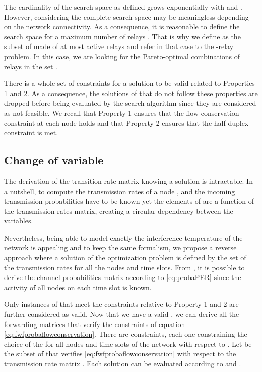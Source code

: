 \documentclass[a4paper]{article}
\begin{document}
The cardinality of the search space  as defined grows exponentially with  and . However, considering the complete search space may be meaningless depending on the network connectivity.  
As a consequence, it is reasonable to define the search space for a maximum number of relays .     
That is why we define  as the subset of  made of at most  active relays and refer in that case to the -relay problem. In this case, we are looking for the Pareto-optimal combinations  of  relays in the set .  

There is a whole set of constraints for a solution  to be valid related to Properties 1 and 2. As a consequence, the solutions of    that do not follow these properties are dropped before being evaluated by the search algorithm since they are considered as not feasible. We recall that Property 1 ensures that the flow conservation constraint at each node holds and that Property 2 ensures that the half duplex constraint is met.  

\subsection{Change of variable}

The derivation of the transition rate matrix  knowing a solution  is intractable. In a nutshell, to compute the transmission rates of a node ,  and the incoming transmission probabilities   have to be known yet the elements of  are a function of the transmission rates matrix, creating a circular dependency between the variables.

Nevertheless, being able to model exactly the interference temperature of the network is appealing and to keep the same formalism, we propose a reverse approach where a solution of the optimization problem is defined by the set  of the transmission rates for all the nodes and time slots. From , it is possible to derive the channel probabilities matrix  according to \eqref{eq:probaPER} since the activity of all nodes on each time slot is known. 

Only instances of  that meet the constraints relative to Property 1 and 2 are further considered as valid. 
Now that we have a valid , we can derive all the forwarding matrices  that verify the constraints of equation \eqref{eq:fwfprobaflowconservation}. 
There are  constraints, each one constraining the choice of the  for all nodes and time slots of the network with respect to .
Let  be the subset of  that verifies \eqref{eq:fwfprobaflowconservation} with respect to the transmission rate matrix . 
Each solution  can be evaluated according to  and . 
\end{document}
